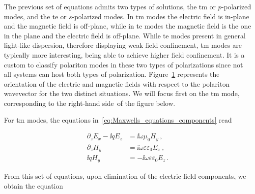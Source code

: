 The previous set of equations admits two types of solutions, the \gls{tm} or $p$-polarized modes, and the \gls{te} or $s$-polarized modes.
In \gls{tm} modes the electric field is in-plane and the magnetic field is off-plane, while in \gls{te} modes the magnetic field is the one in the plane and the electric field is off-plane.
While \gls{te} modes present in general light-like dispersion, therefore displaying weak field confinement, \gls{tm} modes are typically more interesting, being able to achieve higher field confinement.
It is a custom to classify polariton modes in these two types of polarizations since not all systems can host both types of polarization.
Figure~\ref{fig:TE_and_TM_modes} represents the orientation of the electric and magnetic fields with respect to the polariton wavevector for the two distinct situations.
We will focus first on the \gls{tm} mode, corresponding to the right-hand side~of the figure below.

\begin{figure}[b]
    \begin{minipage}{0.7\textwidth}
        
    \end{minipage}%
    \begin{minipage}{0.3\textwidth}
        \label{fig:TE_and_TM_modes}
    \end{minipage}
\end{figure}

\newpage

For \gls{tm} modes, the equations in~\eqref{eq:Maxwells_equations_components} read

\begin{equation}
\label{eq:TM_modes_E_and_H_field_equations}
    \begin{split}
        \partial_z E_x-\ii q E_z &=\ii \omega \mu_0 H_y\,,\\
        \partial_z H_y &=\ii \omega \varepsilon \varepsilon_0  E_x\,,\\
        \ii q H_y &=-\ii \omega \varepsilon \varepsilon_0 E_z\,.
    \end{split}
\end{equation}

\noindent From this set of equations, upon elimination of the electric field components, we obtain the equation

